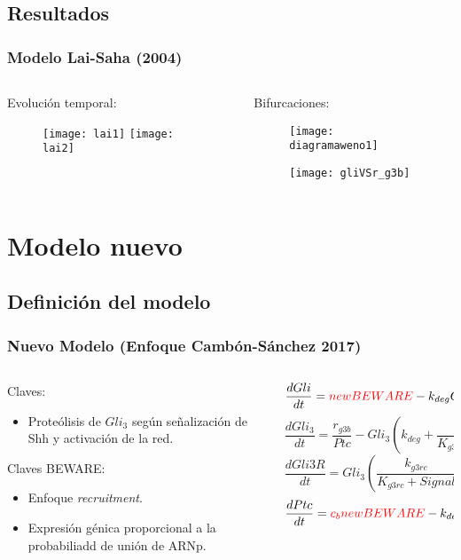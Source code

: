 \documentclass{beamer}
\begin{document}
\subsection{Resultados}
\begin{frame}
\frametitle{Modelo Lai-Saha (2004)}
\begin{columns}
	\begin{column}{0.5\textwidth}
		Evolución temporal:
		\begin{figure}
			\texttt{[image: lai1]}
			\texttt{[image: lai2]}
		\end{figure}
	\end{column}
	\begin{column}{0.5\textwidth}
		Bifurcaciones:
		\begin{figure}
			\texttt{[image: diagramaweno1]}
			
			\texttt{[image: gliVSr\_g3b]}
		\end{figure}
	\end{column}
\end{columns}
\end{frame}

\section{Modelo nuevo}

\subsection{Definición del modelo}

\begin{frame}
\frametitle{Nuevo Modelo (Enfoque Cambón-Sánchez 2017)}
\begin{columns}
	\begin{column}{0.5\textwidth}
		Claves:
		\begin{itemize}
			\item Proteólisis de $Gli_3$ según señalización de Shh y activación de la red.
		\end{itemize}
		Claves \color{red} BEWARE:
		\begin{itemize}
			\item Enfoque \textit{recruitment}.
			\item Expresión génica proporcional a la probabiliadd de unión de ARNp.
		\end{itemize}
	\end{column}
	\begin{column}{0.5\textwidth}
		{\tiny\[ \frac{dGli}{dt} = \color{red}{newBEWARE}\color{black}-k_{deg}Gli \]}
		{\tiny\[ \frac{dGli_3}{dt} = \frac{r_{g3b}}{Ptc}-Gli_3\left(k_{deg}+\frac{k_{g3rc}}{K_{g3rc}+Signal}\right), \]}
		{\tiny\[ \frac{dGli3R}{dt}= Gli_3\left(\frac{k_{g3rc}}{K_{g3rc}+Signal}\right)-k_{deg}Gli3R, \]}
		{\tiny\[ \frac{dPtc}{dt} = \color{red}c_bnewBEWARE\color{black}-k_{degp}Ptc.\]}
		
	\end{column}
\end{columns}
\end{frame}
\end{document}
